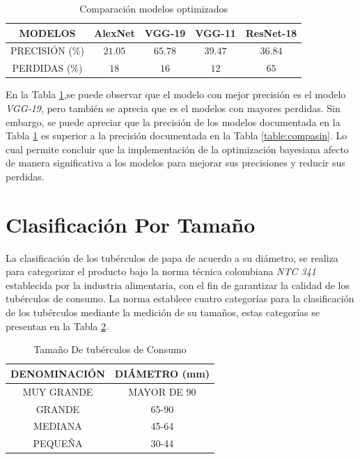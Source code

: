 		\begin{table}[ht]
			\centering
			\begin{tabular}{|c|c|c|c|c|}
				\hline
				MODELOS & AlexNet & VGG-19 & VGG-11 & ResNet-18 \\
				\hline
				PRECISIÓN (\%) & $$21.05$$ & $$65.78$$ & $$39.47$$ & $$36.84$$ \\
				\hline
				PERDIDAS (\%) & $$18$$ & $$16$$ & $$12$$ & $$65$$ \\
				\hline
			\end{tabular}	
			\caption{Comparación modelos optimizados}
			\label{table:compacon}
		\end{table}	
		
		En la Tabla \ref{table:compacon},se puede observar que el modelo con mejor precisión es el modelo \textit{VGG-19}, pero también se aprecia que es el modelos con mayores perdidas. Sin embargo, se puede apreciar que la precisión de los modelos documentada en la Tabla \ref{table:compacon} es superior a la precisión documentada en la Tabla \ref{table:compasin}. Lo cual permite concluir que la implementación de la optimización bayesiana afecto de manera significativa a los modelos para mejorar sus precisiones y reducir sus perdidas.
	
	
	\newpage		
	\section{Clasificación Por Tamaño}
	
	La clasificación de los tubérculos de papa de acuerdo a su diámetro, se realiza para categorizar el producto bajo la norma técnica colombiana \textit{NTC 341} establecida por la industria alimentaria, con el fin de garantizar la calidad de los tubérculos de consumo. 	La norma establece cuatro categorías para la clasificación de los tubérculos mediante la medición de su tamaños, estas categorías se presentan en la Tabla \ref{table:limites}.
		
	\begin{table}[ht]
		\centering
		\begin{tabular}{|c|c|}
			\hline
			DENOMINACIÓN & DIÁMETRO (mm) \\
			\hline
			MUY GRANDE & MAYOR DE 90 \\
			\hline
			GRANDE & 65-90 \\
			\hline
			MEDIANA	& 45-64 \\
			\hline
			PEQUEÑA & 30-44 \\
			\hline
		\end{tabular}	
		\caption{Tamaño De tubérculos de Consumo}
		\label{table:limites}
	\end{table}	
	
